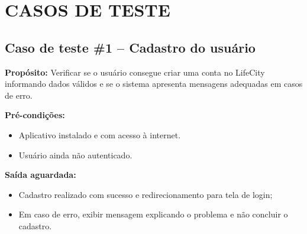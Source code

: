 
\section{CASOS DE TESTE}

\subsection*{Caso de teste \#1 – Cadastro do usuário}

\textbf{Propósito:} Verificar se o usuário consegue criar uma conta no LifeCity
informando dados válidos e se o sistema apresenta mensagens adequadas em
casos de erro.

\textbf{Pré-condições:}
\begin{itemize}
  \item Aplicativo instalado e com acesso à internet.
  \item Usuário ainda não autenticado.
\end{itemize}

\textbf{Saída aguardada:}
\begin{itemize}
  \item Cadastro realizado com sucesso e redirecionamento para tela de login;
  \item Em caso de erro, exibir mensagem explicando o problema e não concluir o cadastro.
\end{itemize}

